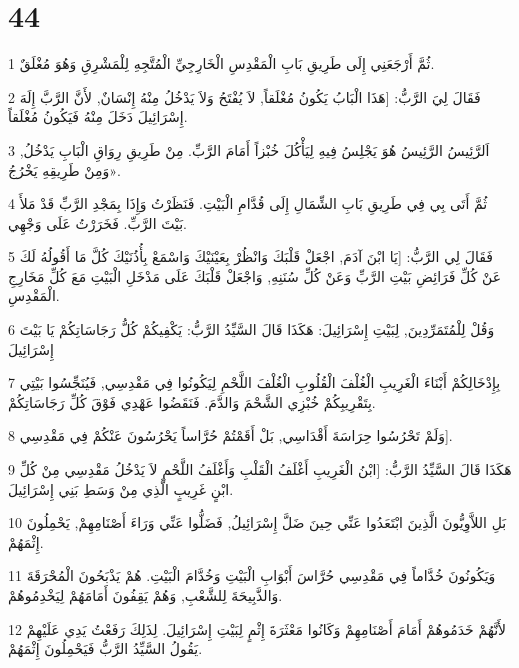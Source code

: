 \chapter{44}

\par 1 ثُمَّ أَرْجَعَنِي إِلَى طَرِيقِ بَابِ الْمَقْدِسِ الْخَارِجِيِّ الْمُتَّجِهِ لِلْمَشْرِقِ وَهُوَ مُغْلَقٌ.
\par 2 فَقَالَ لِيَ الرَّبُّ: [هَذَا الْبَابُ يَكُونُ مُغْلَقاً, لاَ يُفْتَحُ وَلاَ يَدْخُلُ مِنْهُ إِنْسَانٌ, لأَنَّ الرَّبَّ إِلَهَ إِسْرَائِيلَ دَخَلَ مِنْهُ فَيَكُونُ مُغْلَقاً.
\par 3 اَلرَّئِيسُ الرَّئِيسُ هُوَ يَجْلِسُ فِيهِ لِيَأْكُلَ خُبْزاً أَمَامَ الرَّبِّ. مِنْ طَرِيقِ رِوَاقِ الْبَابِ يَدْخُلُ, وَمِنْ طَرِيقِهِ يَخْرُجُ».
\par 4 ثُمَّ أَتَى بِي فِي طَرِيقِ بَابِ الشِّمَالِ إِلَى قُدَّامِ الْبَيْتِ. فَنَظَرْتُ وَإِذَا بِمَجْدِ الرَّبِّ قَدْ مَلأَ بَيْتَ الرَّبِّ. فَخَرَرْتُ عَلَى وَجْهِي.
\par 5 فَقَالَ لِي الرَّبُّ: [يَا ابْنَ آدَمَ, اجْعَلْ قَلْبَكَ وَانْظُرْ بِعَيْنَيْكَ وَاسْمَعْ بِأُذُنَيْكَ كُلَّ مَا أَقُولُهُ لَكَ عَنْ كُلِّ فَرَائِضِ بَيْتِ الرَّبِّ وَعَنْ كُلِّ سُنَنِهِ, وَاجْعَلْ قَلْبَكَ عَلَى مَدْخَلِ الْبَيْتِ مَعَ كُلِّ مَخَارِجِ الْمَقْدِسِ.
\par 6 وَقُلْ لِلْمُتَمَرِّدِينَ, لِبَيْتِ إِسْرَائِيلَ: هَكَذَا قَالَ السَّيِّدُ الرَّبُّ: يَكْفِيكُمْ كُلُّ رَجَاسَاتِكُمْ يَا بَيْتَ إِسْرَائِيلَ
\par 7 بِإِدْخَالِكُمْ أَبْنَاءَ الْغَرِيبِ الْغُلْفَ الْقُلُوبِ الْغُلْفَ اللَّحْمِ لِيَكُونُوا فِي مَقْدِسِي, فَيُنَجِّسُوا بَيْتِي بِتَقْرِيبِكُمْ خُبْزِي الشَّحْمَ وَالدَّمَ. فَنَقَضُوا عَهْدِي فَوْقَ كُلِّ رَجَاسَاتِكُمْ.
\par 8 وَلَمْ تَحْرُسُوا حِرَاسَةَ أَقْدَاسِي, بَلْ أَقَمْتُمْ حُرَّاساً يَحْرُسُونَ عَنْكُمْ فِي مَقْدِسِي].
\par 9 هَكَذَا قَالَ السَّيِّدُ الرَّبُّ: [ابْنُ الْغَرِيبِ أَغْلَفُ الْقَلْبِ وَأَغْلَفُ اللَّحْمِ لاَ يَدْخُلُ مَقْدِسِي مِنْ كُلِّ ابْنٍ غَرِيبٍ الَّذِي مِنْ وَسَطِ بَنِي إِسْرَائِيلَ.
\par 10 بَلِ اللاَّوِيُّونَ الَّذِينَ ابْتَعَدُوا عَنِّي حِينَ ضَلَّ إِسْرَائِيلُ, فَضَلُّوا عَنِّي وَرَاءَ أَصْنَامِهِمْ, يَحْمِلُونَ إِثْمَهُمْ.
\par 11 وَيَكُونُونَ خُدَّاماً فِي مَقْدِسِي حُرَّاسَ أَبْوَابِ الْبَيْتِ وَخُدَّامَ الْبَيْتِ. هُمْ يَذْبَحُونَ الْمُحْرَقَةَ وَالذَّبِيحَةَ لِلشَّعْبِ, وَهُمْ يَقِفُونَ أَمَامَهُمْ لِيَخْدِمُوهُمْ.
\par 12 لأَنَّهُمْ خَدَمُوهُمْ أَمَامَ أَصْنَامِهِمْ وَكَانُوا مَعْثَرَةَ إِثْمٍ لِبَيْتِ إِسْرَائِيلَ. لِذَلِكَ رَفَعْتُ يَدِي عَلَيْهِمْ يَقُولُ السَّيِّدُ الرَّبُّ فَيَحْمِلُونَ إِثْمَهُمْ.
